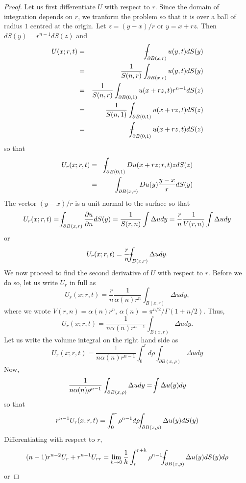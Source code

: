 \documentclass{article}
\newcommand{\pd}[2]{\frac{\partial{#1}}{\partial{#2}}}
\newcommand{\fint}{\mbox{--}\mkern-16mu\int}
\theoremstyle{plain}
\numberwithin{thm}{section}
\theoremstyle{plain}
\numberwithin{prop}{section}
\theoremstyle{definition}
\numberwithin{defn}{section}
\theoremstyle{remark}
\numberwithin{equation}{section}
\begin{document}
\begin{proof}
Let us first differentiate $U$ with respect to $r$. Since the domain of integration depends on $r$, we tranform the
problem so that it is over a ball of radius $1$ centred at the origin. Let $z = (y - x)/r$ or $y = x + rz$. Then
$dS(y) = r^{n-1}dS(z)$ and
\begin{eqnarray*}
U(x; r, t) &=& \fint_{\partial B(x,r)} u(y,t)dS(y) \\
 &=& \frac{1}{S(n, r)}\int_{\partial B(x,r)} u(y, t)dS(y) \\
 &=& \frac{1}{S(n, r)}\int_{\partial B(0,1)} u(x + rz, t)r^{n-1} dS(z) \\
 &=& \frac{1}{S(n, 1)}\int_{\partial B(0,1)} u(x + rz, t) dS(z) \\
 &=& \fint_{\partial B(0,1)} u(x + rz, t)dS(z)
\end{eqnarray*}
so that
\begin{eqnarray*}
U_r(x; r, t) &=& \fint_{\partial B(0, 1)}Du(x + rz; r, t)zdS(z) \\
 &=& \fint_{\partial B(x, r)} Du(y)\frac{y - x}{r}dS(y)
\end{eqnarray*}
The vector $(y - x)/r$ is a unit normal to the surface so that
\[
U_r(x; r, t) = \fint_{\partial B(x, r)} \pd{u}{n}dS(y) = \frac{1}{S(r, n)}\int \Delta u dy 
= \frac{r}{n}\frac{1}{V(r, n)}\int\Delta u dy
\]
or
\begin{equation}\label{s28e15}
U_r(x; r, t) = \frac{r}{n}\fint_{B(x,r)} \Delta u dy.
\end{equation}
We now proceed to find the second derivative of $U$ with respect to $r$. Before we do so, let us write $U_r$ in
full as
\[
U_r(x; r, t) = \frac{r}{n}\frac{1}{\alpha(n)r^n}\int_{B(x, r)}\Delta u dy,
\]
where we wrote $V(r, n) = \alpha(n)r^n$, $\alpha(n) = \pi^{n/2}/\Gamma(1 + n/2)$. Thus,
\begin{equation}\label{s28e16}
U_r(x; r, t) = \frac{1}{n\alpha(n)r^{n-1}}\int_{B(x, r)}\Delta u dy.
\end{equation}
Let us write the volume integral on the right hand side as
\[
U_r(x; r, t) = \frac{1}{n\alpha(n)r^{n-1}}\int_0^r d\rho\int_{\partial B(x,\rho)} \Delta u dy
\]
Now,
\[
\frac{1}{n\alpha(n)\rho^{n-1}}\int_{\partial B(x,\rho)} \Delta u dy = \fint \Delta u(y)dy
\]
so that
\[
r^{n-1}U_r(x; r, t) = \int_0^r \rho^{n-1} d\rho \fint_{\partial B(x,\rho)} \Delta u(y)dS(y)
\]
Differentiating with respect to $r$,
\[
(n-1)r^{n-2}U_r + r^{n-1}U_{rr} = 
\lim_{h\rightarrow 0} \frac{1}{h} \int_r^{r+h} \rho^{n-1} \fint_{\partial B(x,\rho)} \Delta u(y)dS(y)d\rho
\]
or

\end{proof}
\end{document}
